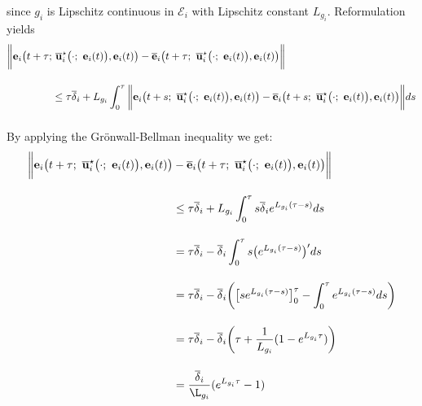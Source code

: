 since $g_i$ is Lipschitz continuous in $\mathcal{E}_i$ with Lipschitz constant
$L_{g_i}$. Reformulation yields
\begin{align}
  \bigg\| \vect{e}_i\big(t+\tau;&\ \overline{\vect{u}}_i^{\star}\big(\cdot;\ \vect{e}_i(t)\big), \vect{e}_i(t)\big) -
  \overline{\vect{e}}_i\big(t+\tau;\ \overline{\vect{u}}_i^{\star}\big(\cdot;\ \vect{e}_i(t)\big), \vect{e}_i(t)\big) \bigg\| \\[2.5ex]
  &\leq \tau \overline{\delta}_i
  + L_{g_i} \int_{0}^{\tau} \bigg\| \vect{e}_i\big(t + s;\ \overline{\vect{u}}_i^{\star}\big(\cdot;\ \vect{e}_i(t)\big), \vect{e}_i(t)\big) -
  \overline{\vect{e}}_i\big(t + s;\ \overline{\vect{u}}_i^{\star}\big(\cdot;\ \vect{e}_i(t)\big), \vect{e}_i(t)\big) \bigg\| ds \\[2.5ex]
\end{align}
By applying the Gr\"{o}nwall-Bellman inequality we get:
\begin{align}
  \bigg\| \vect{e}_i\big(t + \tau;\ \overline{\vect{u}}_i^{\star}\big(\cdot;\ \vect{e}_i(t)\big), \vect{e}_i(t)\big) &-
    \overline{\vect{e}}_i\big(t + \tau;\ \overline{\vect{u}}_i^{\star}\big(\cdot;\ \vect{e}_i(t)\big), \vect{e}_i(t)\big) \bigg\| \\[2.5ex]
  &\leq \tau \overline{\delta}_i +  L_{g_i} \int_{0}^{\tau} s \overline{\delta}_i e^{L_{g_i}(\tau - s)} ds \\[2.5ex]
  &= \tau \overline{\delta}_i - \overline{\delta}_i \int_{0}^{\tau} s  \big(e^{L_{g_i}(\tau - s)}\big)' ds \\[2.5ex]
  &= \tau \overline{\delta}_i -
    \overline{\delta}_i \bigg( \big[s e^{L_{g_i}(\tau - s)}\big]_0^{\tau}
      - \int_{0}^{\tau} e^{L_{g_i}(\tau - s)}ds\bigg) \\[2.5ex]
  &= \tau \overline{\delta}_i - \overline{\delta}_i \bigg( \tau + \dfrac{1}{L_{g_i}} (1- e^{L_{g_i}\tau})\bigg) \\[2.5ex]
  &= \dfrac{\overline{\delta}_i}{\L_{g_i}} (e^{L_{g_i}\tau} - 1)
\end{align}
